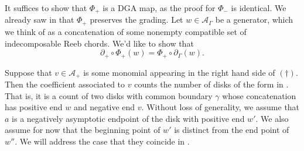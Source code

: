 \documentclass[11pt]{amsart}
\makeatletter
\renewenvironment{proof}[1][\proofname] {\par\pushQED{\qed}{\normalfont\bfseries\topsep6\p@\@plus6\p@\relax #1\@addpunct{.} }}{\popQED\endtrivlist\@endpefalse}
\theoremstyle{mystyle}
\newcommand{\<}{\langle}
\renewcommand{\>}{\rangle}
\makeatother
\begin{document}
\begin{proof}
    It suffices to show that $\Phi_+$ is a DGA map, as the proof for $\Phi_-$ is identical. We already saw in  that $\Phi_+$ preserves the grading. Let $w\in \mathcal{A}_\Gamma$ be a generator, which we think of as a concatenation of some nonempty compatible set of indecomposable Reeb chords. We'd like to show that 
    \[\partial_+\circ \Phi_+(w) = \Phi_+\circ \partial_\Gamma (w).\tag{\dag}\]

    Suppose that $v\in \mathcal{A}_+$ is some monomial appearing in the right hand side of $(\dag)$. Then the coefficient associated to $v$ counts the number of disks of the form in . That is, it is a count of two disks with common boundary $\gamma$ whose concatenation has positive end $w$ and negative end $v$. Without loss of generality, we assume that $a$ is a negatively asymptotic endpoint of the disk with positive end $w'$. We also assume for now that the beginning point of $w'$ is distinct from the end point of $w''$. We will address the case that they coincide in .

    \begin{figure}[h]
        \centering
\begin{tikzpicture}[x=0.65pt,y=0.65pt,yscale=-1,xscale=1]


\end{tikzpicture}
\end{figure}
\end{proof}
\end{document}
